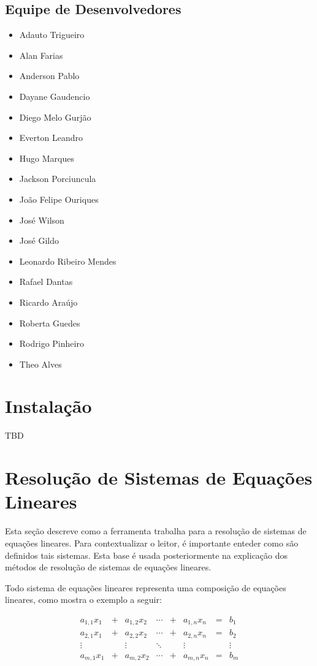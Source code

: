 \documentclass[a4paper,10pt]{report}
\begin{document}
\section{Equipe de Desenvolvedores}

\begin{itemize}
 \item Adauto Trigueiro
 \item Alan Farias
 \item Anderson Pablo
 \item Dayane Gaudencio
 \item Diego Melo Gurjão
 \item Everton Leandro
 \item Hugo Marques
 \item Jackson Porciuncula
 \item João Felipe Ouriques
 \item José Wilson
 \item José Gildo
 \item Leonardo Ribeiro Mendes
 \item Rafael Dantas
 \item Ricardo Araújo
 \item Roberta Guedes
 \item Rodrigo Pinheiro
 \item Theo Alves
\end{itemize}

\chapter{Instalação}
\label{instalacao}

TBD

\chapter{Resolução de Sistemas de Equações Lineares}
\label{resolucao}
Esta seção descreve como a ferramenta trabalha para a resolução de sistemas de equações lineares. Para contextualizar o leitor, é importante enteder como são definidos tais sistemas. Esta base é usada posteriormente na explicação dos métodos de resolução de sistemas de equações lineares.

Todo sistema de equações lineares representa uma composição de equações lineares, como mostra o exemplo a seguir:

\[
\begin{array}{cccccccc}
a_{1,1}x_{1} & + & a_{1,2}x_{2} & \cdots & + & a_{1,n}x_{n} & = & b_{1}\\
a_{2,1}x_{1} & + & a_{2,2}x_{2} & \cdots & + & a_{2,n}x_{n} & = & b_{2}\\
\vdots  & & \vdots  &  \ddots & & \vdots &  & \vdots  \\
a_{m,1}x_{1} & + & a_{m,2}x_{2} & \cdots & + & a_{m,n}x_{n} & = & b_{m}
\label{arr:sistema}
\end{array}
\]
\end{document}
